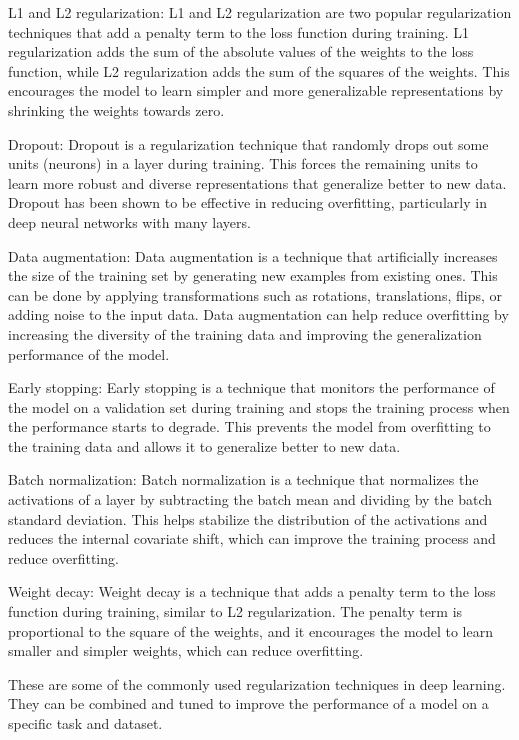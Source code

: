 L1 and L2 regularization: L1 and L2 regularization are two popular regularization techniques that add a penalty term to the loss function during training. L1 regularization adds the sum of the absolute values of the weights to the loss function, while L2 regularization adds the sum of the squares of the weights. This encourages the model to learn simpler and more generalizable representations by shrinking the weights towards zero.

Dropout: Dropout is a regularization technique that randomly drops out some units (neurons) in a layer during training. This forces the remaining units to learn more robust and diverse representations that generalize better to new data. Dropout has been shown to be effective in reducing overfitting, particularly in deep neural networks with many layers.

Data augmentation: Data augmentation is a technique that artificially increases the size of the training set by generating new examples from existing ones. This can be done by applying transformations such as rotations, translations, flips, or adding noise to the input data. Data augmentation can help reduce overfitting by increasing the diversity of the training data and improving the generalization performance of the model.

Early stopping: Early stopping is a technique that monitors the performance of the model on a validation set during training and stops the training process when the performance starts to degrade. This prevents the model from overfitting to the training data and allows it to generalize better to new data.

Batch normalization: Batch normalization is a technique that normalizes the activations of a layer by subtracting the batch mean and dividing by the batch standard deviation. This helps stabilize the distribution of the activations and reduces the internal covariate shift, which can improve the training process and reduce overfitting.

Weight decay: Weight decay is a technique that adds a penalty term to the loss function during training, similar to L2 regularization. The penalty term is proportional to the square of the weights, and it encourages the model to learn smaller and simpler weights, which can reduce overfitting.

These are some of the commonly used regularization techniques in deep learning. They can be combined and tuned to improve the performance of a model on a specific task and dataset.

